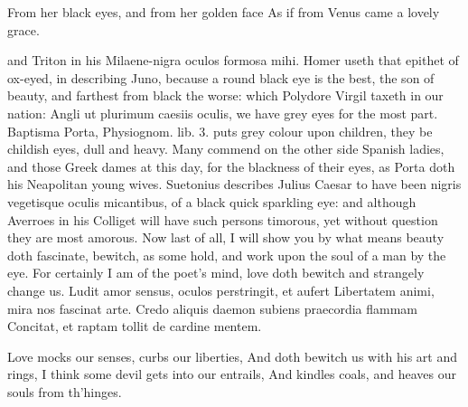 {From her black eyes, and from her golden face
As if from Venus came a lovely grace.

and Triton in his Milaene-nigra oculos formosa mihi. Homer
useth that epithet of ox-eyed, in describing Juno, because a round
black eye is the best, the son of beauty, and farthest from black the
worse: which Polydore Virgil taxeth in our nation: Angli ut
plurimum caesiis oculis, we have grey eyes for the most part. Baptisma
Porta, Physiognom. lib. 3. puts grey colour upon children, they be
childish eyes, dull and heavy. Many commend on the other side Spanish
ladies, and those Greek dames at this day, for the blackness of
their eyes, as Porta doth his Neapolitan young wives. Suetonius
describes Julius Caesar to have been nigris vegetisque oculis
micantibus, of a black quick sparkling eye: and although Averroes in
his Colliget will have such persons timorous, yet without question they
are most amorous.
Now last of all, I will show you by what means beauty doth fascinate,
bewitch, as some hold, and work upon the soul of a man by the eye. For
certainly I am of the poet's mind, love doth bewitch and strangely
change us.
Ludit amor sensus, oculos perstringit, et aufert
Libertatem animi, mira nos fascinat arte.
Credo aliquis daemon subiens praecordia flammam
Concitat, et raptam tollit de cardine mentem.

Love mocks our senses, curbs our liberties,
And doth bewitch us with his art and rings,
I think some devil gets into our entrails,
And kindles coals, and heaves our souls from th'hinges.

}
